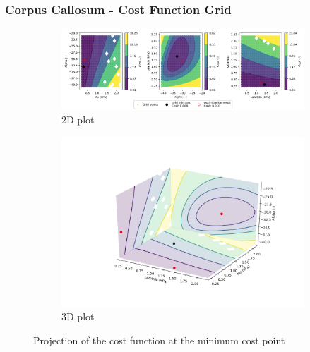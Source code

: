 \documentclass{beamer}
\begin{document}
\begin{frame}
\frametitle{Corpus Callosum - Cost Function Grid}
\begin{figure}[h!]
\centering
\begin{subfigure}[t]{0.6\linewidth}
\centering
\includegraphics[width = 1.\linewidth, trim = 80 00 50 00]
{Pictures/CorpusCallosumMinPointProjection}
\caption{2D plot}
\end{subfigure}%
\begin{subfigure}[t]{0.4\linewidth}
\centering
\includegraphics[width = 1.\textwidth, trim = 50 50 80 50]
{Pictures/CorpusCallosumMinPointProjection3D}
\caption{3D plot}
\end{subfigure}
\caption{Projection of the cost function at the minimum cost point}
\end{figure}
\end{frame}

\end{document}
